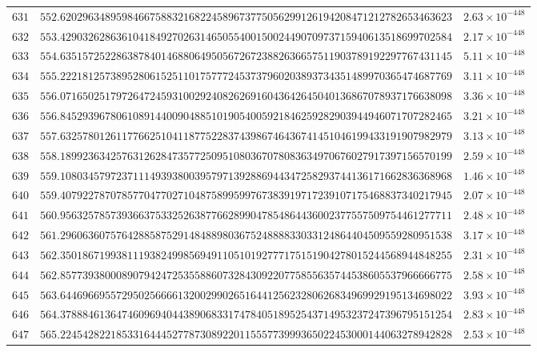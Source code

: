 \documentclass[12pt,reqno]{amsart}
\theoremstyle{remark}
\begin{document}
\begin{longtable}{clc}
$631$ & $552.6202963489598466758832168224589673775056299126194208471212782653463623$ & $2.63\times 10^{-448}$ \\
$632$ & $553.4290326286361041849270263146505540015002449070973715940613518699702584$ & $2.17\times 10^{-448}$ \\
$633$ & $554.6351572522863878401468806495056726723882636657511903789192297767431145$ & $5.11\times 10^{-448}$ \\
$634$ & $555.2221812573895280615251101757772453737960203893734351489970365474687769$ & $3.11\times 10^{-448}$ \\
$635$ & $556.0716502517972647245931002924082626916043642645040136867078937176638098$ & $3.36\times 10^{-448}$ \\
$636$ & $556.8452939678061089144009048851019054005921846259282903944946071707282465$ & $3.21\times 10^{-448}$ \\
$637$ & $557.6325780126117766251041187752283743986746436741451046199433191907982979$ & $3.13\times 10^{-448}$ \\
$638$ & $558.1899236342576312628473577250951080367078083634970676027917397156570199$ & $2.59\times 10^{-448}$ \\
$639$ & $559.1080345797237111493938003957971392886944347258293744136171662836368968$ & $1.46\times 10^{-448}$ \\
$640$ & $559.4079227870785770477027104875899599767383919717239107175468837340217945$ & $2.07\times 10^{-448}$ \\
$641$ & $560.9563257857393663753325263877662899047854864436002377557509754461277711$ & $2.48\times 10^{-448}$ \\
$642$ & $561.2960636075764288587529148488980367524888833033124864404509559280951538$ & $3.17\times 10^{-448}$ \\
$643$ & $562.3501867199381119382499856949110510192777175151904278015244568944848255$ & $2.31\times 10^{-448}$ \\
$644$ & $562.8577393800089079424725355886073284309220775855635744538605537966666775$ & $2.58\times 10^{-448}$ \\
$645$ & $563.6446966955729502566661320029902651644125623280626834969929195134698022$ & $3.93\times 10^{-448}$ \\
$646$ & $564.3788846136474609694044389068331747840518952543714953237247396795151254$ & $2.83\times 10^{-448}$ \\
$647$ & $565.2245428221853316444527787308922011555773999365022453000144063278942828$ & $2.53\times 10^{-448}$ \\

\end{longtable}
\end{document}
